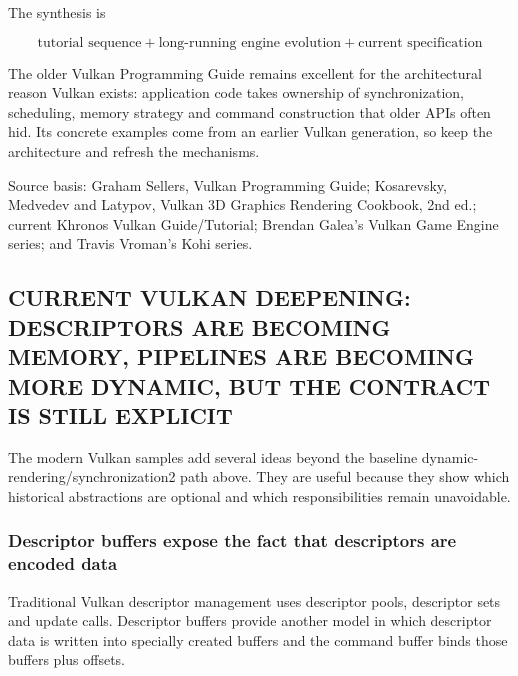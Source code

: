 The synthesis is

\[
\boxed{
\text{tutorial sequence}
+
\text{long-running engine evolution}
+
\text{current specification}
}
\]

The older Vulkan Programming Guide remains excellent for the architectural reason Vulkan exists: application code takes ownership of synchronization, scheduling, memory strategy and command construction that older APIs often hid. Its concrete examples come from an earlier Vulkan generation, so keep the architecture and refresh the mechanisms.

Source basis: Graham Sellers, Vulkan Programming Guide; Kosarevsky, Medvedev and Latypov, Vulkan 3D Graphics Rendering Cookbook, 2nd ed.; current Khronos Vulkan Guide/Tutorial; Brendan Galea's Vulkan Game Engine series; and Travis Vroman's Kohi series.

\subsection{CURRENT VULKAN DEEPENING: DESCRIPTORS ARE BECOMING MEMORY, PIPELINES ARE BECOMING MORE DYNAMIC, BUT THE CONTRACT IS STILL EXPLICIT}\label{05-engine-i-ch023-current-vulkan-deepening-descriptors-are-becoming-memory-pipelines-are-becoming-more-dynamic-but-the-contract-is-still-explicit}

\hypertarget{05-engine-i-ch023-current-vulkan-deepening-descriptors-are-becoming-memory-pipelines-are-becoming-more-dynamic-but-the-contract-is-still-explicit}{}

The modern Vulkan samples add several ideas beyond the baseline dynamic-rendering/synchronization2 path above. They are useful because they show which historical abstractions are optional and which responsibilities remain unavoidable.

\subsubsection{Descriptor buffers expose the fact that descriptors are encoded data}\label{05-engine-i-ch023-descriptor-buffers-expose-the-fact-that-descriptors-are-encoded-data}

\hypertarget{05-engine-i-ch023-descriptor-buffers-expose-the-fact-that-descriptors-are-encoded-data}{}

Traditional Vulkan descriptor management uses descriptor pools, descriptor sets and update calls. Descriptor buffers provide another model in which descriptor data is written into specially created buffers and the command buffer binds those buffers plus offsets.

